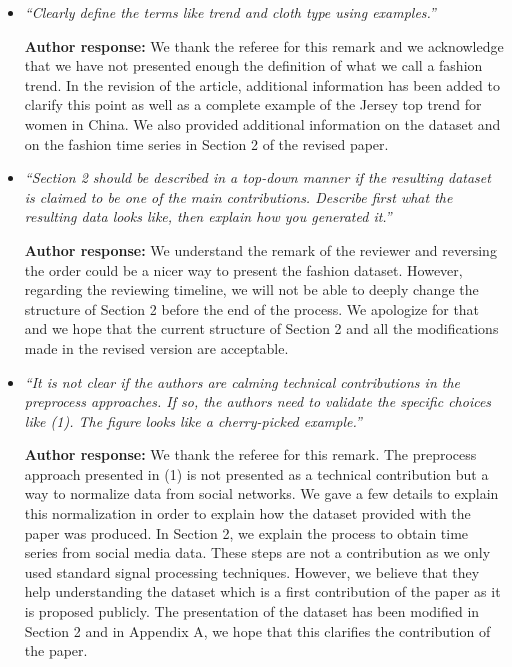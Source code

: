 \documentclass[10pt]{article} %
\begin{document}
\begin{itemize}
	\item {\em ``Clearly define the terms like trend and cloth type using examples.''} \medskip
	
	\textbf{Author response:} We thank the referee for this remark and we acknowledge that we have not presented enough the definition of what we call a fashion trend. In the revision of the article, additional information has been added to clarify this point as well as a complete example of the Jersey top trend for women in China. We also provided additional information on the dataset and on the fashion time series in Section 2 of the revised paper.\\
	
	\item {\em ``Section 2 should be described in a top-down manner if the resulting dataset is claimed to be one of the main contributions. Describe first what the resulting data looks like, then explain how you generated it.''} \medskip
	
	\textbf{Author response:} We understand the remark of the reviewer and reversing the order could be a nicer way to present the fashion dataset. However, regarding the reviewing timeline, we will not be able to deeply change the structure of Section 2 before the end of the process. We apologize for that and we hope that the current structure of Section 2 and all the modifications made in the revised version are  acceptable.\\
	
	\item {\em ``It is not clear if the authors are calming technical contributions in the preprocess approaches. If so, the authors need to validate the specific choices like (1). The figure looks like a cherry-picked example.''} \medskip
	
	\textbf{Author response:} We thank the referee for this remark. The preprocess approach presented in (1) is not presented as a technical contribution but  a  way to normalize data from social networks. We gave a few details to explain this normalization in order to explain how the dataset provided with the paper was produced. In Section 2, we explain the process to obtain time series from social media data. These steps are not a contribution as we only used standard signal processing techniques. However, we believe that they help understanding the dataset which is a first contribution of the paper as it is proposed publicly. The presentation of the dataset has been modified in Section 2 and in Appendix A, we hope that this clarifies the contribution of the paper.\\


\end{itemize}
\end{document}
